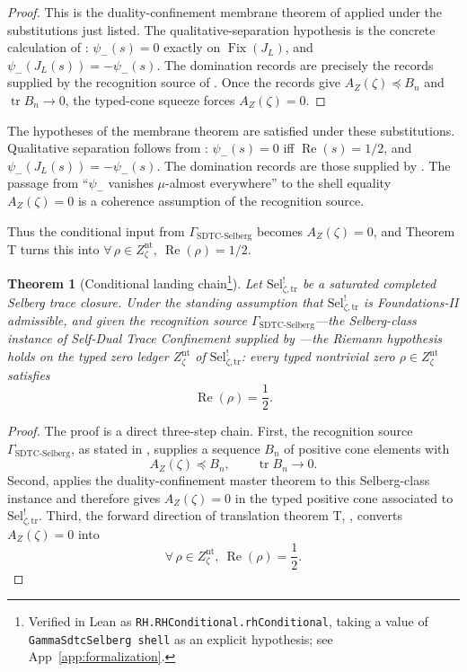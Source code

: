 \documentclass[11pt]{article}
\DeclareMathOperator{\Fix}{Fix}
\DeclareMathOperator{\trace}{tr}
\DeclareMathOperator{\Real}{Re}
\newcommand{\JL}{J_{L}}
\newcommand{\psimRH}{\psi_{-}}
\newcommand{\Znt}{Z_{\zeta}^{\mathrm{nt}}}
\newcommand{\AZ}{A_{Z}(\zeta)}
\newcommand{\Sel}{\mathrm{Sel}^{!}_{\zeta,\mathrm{tr}}}
\newcommand{\GamSDTCSelberg}{\Gamma_{\mathrm{SDTC\text{-}Selberg}}}
\newcommand{\psim}{\psi_{-}}
\newtheorem{theorem}{Theorem}[section]
\theoremstyle{definition}
\begin{document}
\begin{proof}
This is the duality-confinement membrane theorem of
\citet{TsiokosSDTC2026} applied under the substitutions just listed.
The qualitative-separation hypothesis is the concrete calculation of
: \(\psimRH(s)=0\) exactly on
\(\Fix(\JL)\), and \(\psimRH(\JL(s))=-\psimRH(s)\).  The domination
records are precisely the records supplied by the recognition source
of .  Once the records give
\(\AZ\preceq B_n\) and \(\trace B_n\to0\), the typed-cone squeeze
forces \(\AZ=0\).
\end{proof}

The hypotheses of the membrane theorem are satisfied under these
substitutions.  Qualitative separation follows from
: \(\psimRH(s)=0\) iff \(\Real(s)=1/2\),
and \(\psimRH(\JL(s))=-\psimRH(s)\).  The domination records are
those supplied by .  The passage from
``\(\psim\) vanishes \(\mu\)-almost everywhere'' to the shell equality
\(\AZ=0\) is a coherence assumption of the recognition source.

Thus the conditional input from \(\GamSDTCSelberg\) becomes
\(\AZ=0\), and Theorem T turns this into
\(\forall\,\rho\in\Znt,\ \Real(\rho)=1/2\).

\begin{theorem}[Conditional landing chain\footnote{Verified in Lean as \nolinkurl{RH.RHConditional.rhConditional}, taking a value of \nolinkurl{GammaSdtcSelberg shell} as an explicit hypothesis; see App~\ref{app:formalization}.}]
\label{thm:rh:conditional}
Let \(\Sel\) be a saturated completed Selberg trace closure.  Under
the standing assumption that \(\Sel\) is Foundations-II admissible,
and given the recognition source \(\GamSDTCSelberg\)---the
Selberg-class instance of Self-Dual Trace Confinement supplied by
\citet{TsiokosSDTC2026}---the Riemann hypothesis holds on the typed
zero ledger \(\Znt\) of \(\Sel\): every typed nontrivial zero
\(\rho\in\Znt\) satisfies
\[
  \Real(\rho)=\frac{1}{2}.
\]
\end{theorem}

\begin{proof}
The proof is a direct three-step chain.  First, the recognition
source \(\GamSDTCSelberg\), as stated in
, supplies a sequence \(B_n\) of
positive cone elements with
\[
  \AZ\preceq B_n,
  \qquad
  \trace B_n\to0.
\]
Second,  applies the
duality-confinement master theorem to this Selberg-class instance and
therefore gives \(\AZ=0\) in the typed positive cone associated to
\(\Sel\).  Third, the forward direction of translation theorem T,
, converts \(\AZ=0\) into
\[
  \forall\,\rho\in\Znt,\ \Real(\rho)=\frac{1}{2}.
\]
\end{proof}
\end{document}
